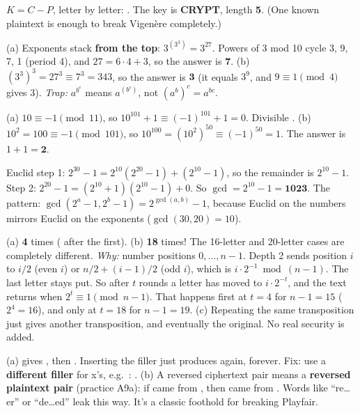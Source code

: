 \ans $K = C - P$, letter by letter: . The key is \textbf{CRYPT}, length \textbf{5}.
(One known plaintext is enough to break Vigen\`ere completely.)

\ans (a) Exponents stack \textbf{from the top}: $3^{(3^3)} = 3^{27}$. Powers of 3 mod 10 cycle 3, 9, 7, 1 (period 4), and $27 = 6\cdot4 + 3$, so the answer is $\mathbf{7}$.
(b) $(3^3)^3 = 27^3 \equiv 7^3 = 343$, so the answer is $\mathbf{3}$ (it equals $3^9$, and $9 \equiv 1 \pmod 4$ gives 3).
\emph{Trap:} $a^{b^c}$ means $a^{(b^c)}$, not $(a^b)^c = a^{bc}$.

\ans (a) $10 \equiv -1 \pmod{11}$, so $10^{101} + 1 \equiv (-1)^{101} + 1 = 0$. Divisible \checkmark.
(b) $10^2 = 100 \equiv -1 \pmod{101}$, so $10^{100} = (10^2)^{50} \equiv (-1)^{50} = 1$. The answer is $1 + 1 = \mathbf{2}$.

\ans Euclid step 1: $2^{30} - 1 = 2^{10}(2^{20} - 1) + (2^{10} - 1)$, so the remainder is $2^{10} - 1$.
Step 2: $2^{20} - 1 = (2^{10} + 1)(2^{10} - 1) + 0$. So $\gcd = 2^{10} - 1 = \mathbf{1023}$.
The pattern: $\gcd(2^a - 1, 2^b - 1) = 2^{\gcd(a,b)} - 1$, because Euclid on the numbers mirrors Euclid on the exponents ($\gcd(30, 20) = 10$).

\ans (a) \textbf{4} times ( after the first).
(b) \textbf{18} times! The 16-letter and 20-letter cases are completely different.
\emph{Why:} number positions $0, \dots, n-1$. Depth 2 sends position $i$ to $i/2$ (even $i$) or $n/2 + (i-1)/2$ (odd $i$), which is $i \cdot 2^{-1} \bmod (n - 1)$. The last letter stays put. So after $t$ rounds a letter has moved to $i \cdot 2^{-t}$, and the text returns when $2^t \equiv 1 \pmod{n - 1}$. That happens first at $t = 4$ for $n - 1 = 15$ ($2^4 = 16$), and only at $t = 18$ for $n - 1 = 19$.
(c) Repeating the same transposition just gives another transposition, and eventually the original. No real security is added.

\ans (a)  gives , then . Inserting the filler  just produces  again, forever. Fix: use a \textbf{different filler} for x's, e.g.\ : .
(b) A reversed ciphertext pair means a \textbf{reversed plaintext pair} (practice A9a): if  came from , then  came from . Words like ``re\dots er'' or ``de\dots ed'' leak this way. It's a classic foothold for breaking Playfair.

